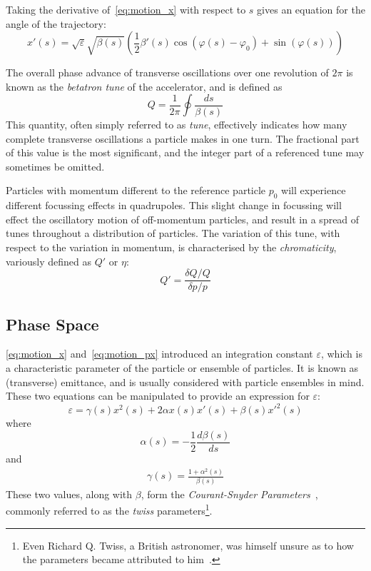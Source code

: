 \documentclass[11pt]{report}
\begin{document}
Taking the derivative of~\eqref{eq:motion_x} with respect to $s$ gives an equation for the angle of the trajectory:
\begin{equation}
x'(s)=\sqrt{\varepsilon}\sqrt{\beta(s)}\left(\frac12\beta'(s)\cos(\varphi(s)-\varphi_0)+\sin(\varphi(s))\right)
\label{eq:motion_px}
\end{equation}

The overall phase advance of transverse oscillations over one revolution of $2\pi$ is known as the \textit{betatron tune} of the accelerator, and is defined as
\begin{equation}
  Q=\frac1{2\pi}\oint\frac{ds}{\beta(s)}
  \label{eq:betatron_tune}
\end{equation}
This quantity, often simply referred to as \textit{tune}, effectively indicates how many complete transverse oscillations a particle makes in one turn. The fractional part of this value is the most significant, and the integer part of a referenced tune may sometimes be omitted.

Particles with momentum different to the reference particle $p_0$ will experience different focussing effects in quadrupoles. This slight change in focussing will effect the oscillatory motion of off-momentum particles, and result in a spread of tunes throughout a distribution of particles. The variation of this tune, with respect to the variation in momentum, is characterised by the \textit{chromaticity}, variously defined as $Q'$ or $\eta$:
\begin{equation}
  Q' = \frac{\delta Q/Q}{\delta p/p}
  \label{eq:chroma}
\end{equation}

\subsection{Phase Space}\label{subsec:trans_phase_space}

\autoref{eq:motion_x} and~\autoref{eq:motion_px} introduced an integration constant $\varepsilon$, which is a characteristic parameter of the particle or ensemble of particles. It is known as (transverse) emittance, and is usually considered with particle ensembles in mind. These two equations can be manipulated to provide an expression for $\varepsilon$:
\begin{equation}
  \varepsilon = \gamma(s)x^2(s)+2\alpha x(s)x'(s)+\beta(s)x'^2(s)
  \label{eq:emittance}
\end{equation} where 
\begin{equation}
  \alpha(s) = -\frac12\frac{d\beta(s)}{ds}
  \label{eq:alpha}
\end{equation} and
\begin{eqnarray}
  \gamma(s) = \frac{1+\alpha^2(s)}{\beta(s)}
  \label{eq:gamma}
\end{eqnarray}
These two values, along with $\beta$, form the \textit{Courant-Snyder Parameters}~\cite{courantsnyder}, commonly referred to as the \textit{twiss} parameters\footnote{Even Richard Q. Twiss, a British astronomer, was himself unsure as to how the parameters became attributed to him~\cite{richardtwiss}.}. 
\end{document}
